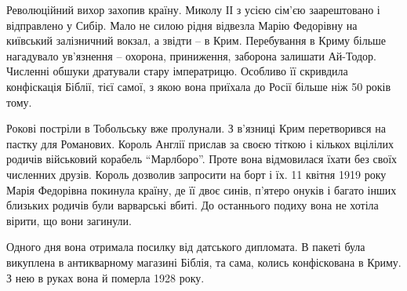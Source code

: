 Революційний вихор захопив країну. Миколу ІІ з усією сім’єю заарештовано і
відправлено у Сибір. Мало не силою рідня відвезла Марію Федорівну на київський
залізничний вокзал, а звідти – в Крим. Перебування в Криму більше нагадувало
ув’язнення – охорона, приниження, заборона залишати Ай-Тодор. Численні обшуки
дратували стару імператрицю. Особливо її скривдила конфіскація Біблії, тієї
самої, з якою вона приїхала до Росії більше ніж 50 років тому. 

Рокові постріли в Тобольську вже пролунали. З в’язниці Крим перетворився на
пастку для Романових. Король Англії прислав за своєю тіткою і кількох вцілілих
родичів військовий корабель \enquote{Марлборо}. Проте вона відмовилася їхати без своїх
численних друзів. Король дозволив запросити на борт і їх. 11 квітня 1919 року
Марія Федорівна покинула країну, де її двоє синів, п’ятеро онуків і багато
інших близьких родичів були варварські вбиті. До останнього подиху вона не
хотіла вірити, що вони загинули.    

Одного дня вона отримала посилку від датського дипломата. В пакеті була
викуплена в антикварному магазині Біблія, та сама, колись конфіскована в Криму.
З нею в руках вона й померла 1928 року.

